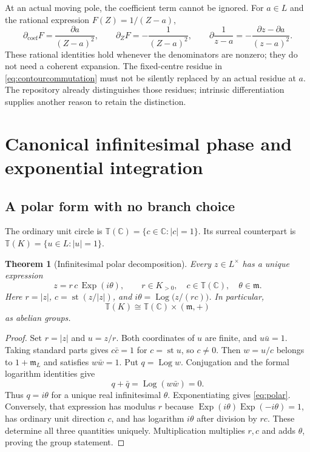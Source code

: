\documentclass[11pt]{article}
\numberwithin{equation}{section}
\newtheorem{theorem}{Theorem}[section]
\theoremstyle{definition}
\newcommand{\C}{\mathbb C}
\newcommand{\mm}{\mathfrak m}
\newcommand{\DD}{\partial}
\newcommand{\Dc}{\partial_{\mathrm{coef}}}
\newcommand{\Dz}{\partial_Z}
\newcommand{\Exp}{\operatorname{Exp}}
\newcommand{\Log}{\operatorname{Log}}
\newcommand{\st}{\operatorname{st}}
\begin{document}
At an actual moving pole, the coefficient term cannot be ignored. For
$a\in L$ and the rational expression $F(Z)=1/(Z-a)$,
\begin{equation}\label{eq:movingpole}
 \Dc F=\frac{\DD a}{(Z-a)^2},\qquad
 \Dz F=-\frac{1}{(Z-a)^2},\qquad
 \DD\frac1{z-a}=-\frac{\DD z-\DD a}{(z-a)^2}.
\end{equation}
These rational identities hold whenever the denominators are nonzero;
they do not need a coherent expansion. The fixed-centre residue in
\eqref{eq:contourcommutation} must not be silently replaced by an actual
residue at $a$. The repository already distinguishes those residues;
intrinsic differentiation supplies another reason to retain the distinction.

\section{Canonical infinitesimal phase and exponential integration}
\label{sec:phase}

\subsection{A polar form with no branch choice}
The ordinary unit circle is
$\mathbb T(\C)=\{c\in\C:|c|=1\}$. Its surreal counterpart is
$\mathbb T(K)=\{u\in L:|u|=1\}$.

\begin{theorem}[Infinitesimal polar decomposition]\label{thm:polar}
Every $z\in L^\times$ has a unique expression
\begin{equation}\label{eq:polar}
 z=r\,c\,\Exp(i\theta),
 \qquad r\in K_{>0},\quad c\in\mathbb T(\C),\quad\theta\in\mm.
\end{equation}
Here $r=|z|$, $c=\st(z/|z|)$, and
$i\theta=\Log\bigl(z/(rc)\bigr)$. In particular,
\[
 \mathbb T(K)\cong\mathbb T(\C)\times(\mm,+)
\]
as abelian groups.
\end{theorem}
\begin{proof}
Set $r=|z|$ and $u=z/r$. Both coordinates of $u$ are finite, and
$u\bar u=1$. Taking standard parts gives $c\bar c=1$ for
$c=\st u$, so $c\ne0$. Then $w=u/c$ belongs to $1+\mm_L$ and
satisfies $w\bar w=1$. Put $q=\Log w$. Conjugation and the formal
logarithm identities give
\[
 q+\bar q=\Log(w\bar w)=0.
\]
Thus $q=i\theta$ for a unique real infinitesimal $\theta$.
Exponentiating gives \eqref{eq:polar}. Conversely, that expression has
modulus $r$ because $\Exp(i\theta)\Exp(-i\theta)=1$, has ordinary
unit direction $c$, and has logarithm $i\theta$ after division by $rc$.
These determine all three quantities uniquely. Multiplication multiplies
$r,c$ and adds $\theta$, proving the group statement.
\end{proof}
\end{document}
